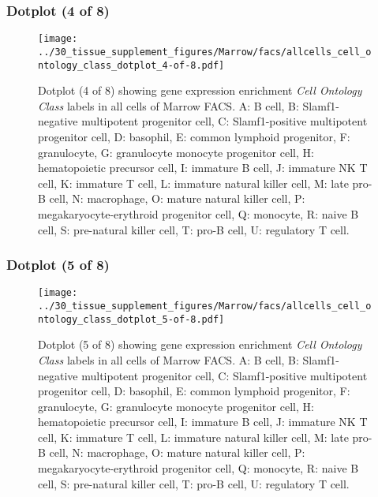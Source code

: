 \subsubsection{Dotplot (4 of 8)}
\begin{figure}[h]
\centering
\texttt{[image: ../30\_tissue\_supplement\_figures/Marrow/facs/allcells\_cell\_ontology\_class\_dotplot\_4-of-8.pdf]}

\caption{ Dotplot (4 of 8)  showing gene expression enrichment \emph{Cell Ontology Class} labels in all cells of Marrow FACS. A: B cell, B: Slamf1-negative multipotent progenitor cell, C: Slamf1-positive multipotent progenitor cell, D: basophil, E: common lymphoid progenitor, F: granulocyte, G: granulocyte monocyte progenitor cell, H: hematopoietic precursor cell, I: immature B cell, J: immature NK T cell, K: immature T cell, L: immature natural killer cell, M: late pro-B cell, N: macrophage, O: mature natural killer cell, P: megakaryocyte-erythroid progenitor cell, Q: monocyte, R: naive B cell, S: pre-natural killer cell, T: pro-B cell, U: regulatory T cell.}
\end{figure}


\clearpage

\subsubsection{Dotplot (5 of 8)}
\begin{figure}[h]
\centering
\texttt{[image: ../30\_tissue\_supplement\_figures/Marrow/facs/allcells\_cell\_ontology\_class\_dotplot\_5-of-8.pdf]}

\caption{ Dotplot (5 of 8)  showing gene expression enrichment \emph{Cell Ontology Class} labels in all cells of Marrow FACS. A: B cell, B: Slamf1-negative multipotent progenitor cell, C: Slamf1-positive multipotent progenitor cell, D: basophil, E: common lymphoid progenitor, F: granulocyte, G: granulocyte monocyte progenitor cell, H: hematopoietic precursor cell, I: immature B cell, J: immature NK T cell, K: immature T cell, L: immature natural killer cell, M: late pro-B cell, N: macrophage, O: mature natural killer cell, P: megakaryocyte-erythroid progenitor cell, Q: monocyte, R: naive B cell, S: pre-natural killer cell, T: pro-B cell, U: regulatory T cell.}
\end{figure}


\clearpage

